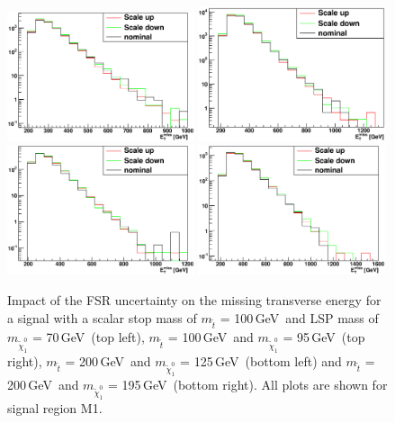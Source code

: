\begin{figure}[tb]
\begin{center}
  \includegraphics[width=0.49\textwidth]{Interpretations/Figures/stop_100_70_FSR.eps} 
  \includegraphics[width=0.49\textwidth]{Interpretations/Figures/stop_100_95_FSR.eps} 
  \includegraphics[width=0.49\textwidth]{Interpretations/Figures/stop_200_125_FSR.eps}
  \includegraphics[width=0.49\textwidth]{Interpretations/Figures/stop_200_195_FSR.eps}
\end{center}
\caption[Impact of the FSR uncertainty on several signal models.]{Impact of the FSR uncertainty on the missing transverse
  energy for a signal with a scalar
  stop mass of $m_{\tilde{t}}$ = 100\,GeV\ and LSP mass of
  $m_{\tilde{\chi}^0_1}$ = 70\,GeV\ (top left), $m_{\tilde{t}}$ = 100\,GeV\ and
  $m_{\tilde{\chi}^0_1}$ = 95\,GeV\ (top right), $m_{\tilde{t}}$ = 200\,GeV\ and
  $m_{\tilde{\chi}^0_1}$ = 125\,GeV\ (bottom left) and $m_{\tilde{t}}$ = 200\,GeV\ and
  $m_{\tilde{\chi}^0_1}$ = 195\,GeV\ (bottom right).  All plots are
  shown for signal region M1.}
\label{fig:signalfsrsysta6}
\end{figure}

